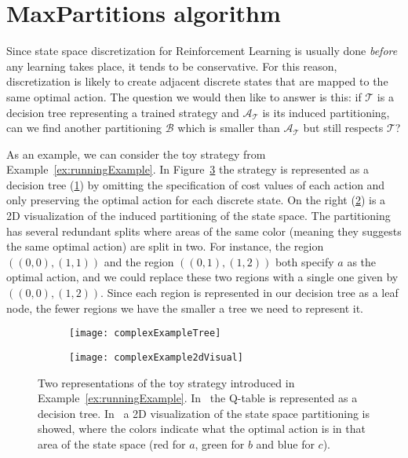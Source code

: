 \section{MaxPartitions algorithm}%
\label{sec:maxParts}

Since state space discretization for Reinforcement Learning is usually done
\textit{before} any learning takes place, it tends to be conservative. For this
reason, discretization is likely to create adjacent discrete states that are
mapped to the same optimal action. The question we would then like to answer is
this: if $\mathcal{T}$ is a decision tree representing a trained strategy and
$\mathcal{A}_{\mathcal{T}}$ is its induced partitioning, can we find another
partitioning $\mathcal{B}$ which is smaller than $\mathcal{A}_{\mathcal{T}}$ but
still respects $\mathcal{T}$?

As an example, we can consider the toy strategy from
Example~\ref{ex:runningExample}. In Figure~\ref{fig:complexExample} the strategy
is represented as a decision tree (\ref{fig:complexExampleTree}) by omitting the
specification of cost values of each action and only preserving the optimal
action for each discrete state. On the right (\ref{fig:complexExample2dVisual})
is a 2D visualization of the induced partitioning of the state space. The
partitioning has several redundant splits where areas of the same color (meaning
they suggests the same optimal action) are split in two. For instance, the
region $((0,0),(1,1))$ and the region $((0,1),(1,2))$ both specify $a$ as the
optimal action, and we could replace these two regions with a single one given
by $((0,0),(1,2))$.  Since each region is represented in our decision tree as a
leaf node, the fewer regions we have the smaller a tree we need to represent it.

\begin{figure}[ht]
    \begin{subfigure}[b]{.5\textwidth}
        \centering
        \texttt{[image: complexExampleTree]}
        \subcaption{%
        }\label{fig:complexExampleTree}
    \end{subfigure}
    \begin{subfigure}[b]{.5\textwidth}
        \centering
        \texttt{[image: complexExample2dVisual]}
        \subcaption{%
        }\label{fig:complexExample2dVisual}
    \end{subfigure}%

    \caption{%
        Two representations of the toy strategy introduced in
        Example~\ref{ex:runningExample}. In~ the
        Q-table is represented as a decision tree.
        In~ a 2D visualization of the state
        space partitioning is showed, where the colors indicate what the optimal
        action is in that area of the state space (red for $a$, green for $b$
        and blue for $c$).
    }%
    \label{fig:complexExample}
\end{figure}

